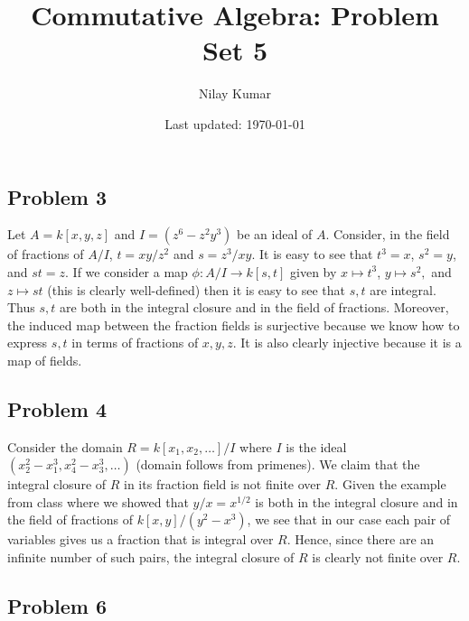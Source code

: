 \documentclass{../../mathnotes}
\title{Commutative Algebra: Problem Set 5}
\author{Nilay Kumar}
\date{Last updated: \today}
\begin{document}
\maketitle

\subsection*{Problem 3}

Let $A=k[x,y,z]$ and $I=(z^6-z^2y^3)$ be an ideal of $A$. 
Consider, in the field of fractions of $A/I$, $t=xy/z^2$ and $s=z^3/xy$. It is easy to see that $t^3=x$, $s^2=y$, and $st=z$. 
If we consider a map $\phi: A/I\to k[s,t]$ given by $x\mapsto t^3$, $y\mapsto s^2,$ and $z\mapsto st$ (this is clearly well-defined)
then it is easy to see that $s,t$ are integral. Thus $s,t$ are both in the integral closure and in the field of fractions. Moreover,
the induced map between the fraction fields is surjective because we know how to express $s,t$ in terms of fractions of $x,y,z$.
It is also clearly injective because it is a map of fields.

\subsection*{Problem 4}

Consider the domain $R=k[x_1,x_2,\ldots]/I$ where $I$ is the ideal $(x_2^2-x_1^3,x_4^2-x_3^3,\ldots)$ (domain follows from primenes).
We claim that the integral closure of $R$ in its fraction field is not finite over $R$. Given the example from class where we showed
that $y/x=x^{1/2}$ is both in the integral closure and in the field of fractions of $k[x,y]/(y^2-x^3)$, we see that in our case each
pair of variables gives us a fraction that is integral over $R$. Hence, since there are an infinite number of such pairs, the integral
closure of $R$ is clearly not finite over $R$.

\subsection*{Problem 6}
\end{document}
